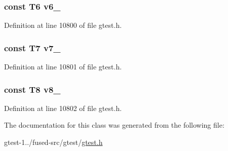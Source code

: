 \hypertarget{classtesting_1_1internal_1_1ValueArray8_a13d84d5824617bbc6fb1a6b3ee3cb745}{
\subsubsection[{v6\-\_\-}]{\setlength{\rightskip}{0pt plus 5cm}const \-T6 {\bf v6\-\_\-}}}\label{d6/dd6/classtesting_1_1internal_1_1ValueArray8_a13d84d5824617bbc6fb1a6b3ee3cb745}


\-Definition at line 10800 of file gtest.\-h.

\hypertarget{classtesting_1_1internal_1_1ValueArray8_a4063f0b7a528133d018ee488ba44a9a3}{
\subsubsection[{v7\-\_\-}]{\setlength{\rightskip}{0pt plus 5cm}const \-T7 {\bf v7\-\_\-}}}\label{d6/dd6/classtesting_1_1internal_1_1ValueArray8_a4063f0b7a528133d018ee488ba44a9a3}


\-Definition at line 10801 of file gtest.\-h.

\hypertarget{classtesting_1_1internal_1_1ValueArray8_a596bc5260b2474271d1f6910ff6f665d}{
\subsubsection[{v8\-\_\-}]{\setlength{\rightskip}{0pt plus 5cm}const \-T8 {\bf v8\-\_\-}}}\label{d6/dd6/classtesting_1_1internal_1_1ValueArray8_a596bc5260b2474271d1f6910ff6f665d}


\-Definition at line 10802 of file gtest.\-h.



\-The documentation for this class was generated from the following file\-:\begin{DoxyCompactItemize}
\item 
gtest-\/1../fused-\/src/gtest/\hyperlink{fused-src_2gtest_2gtest_8h}{gtest.\-h}\end{DoxyCompactItemize}
